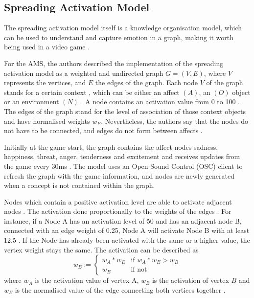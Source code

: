 \subsection{Spreading Activation Model}

The spreading activation model \cite{collins1975spreading} itself is a knowledge 
organisation model, which can be used to understand and capture emotion \cite{hutMcCormAms}\cite{carr1982words} in a graph, making it 
worth being used in a video game \cite{hutMcCormAms}.

For the AMS, the authors described the implementation
of the spreading activation model as a weighted and 
undirected graph \( G = (V, E) \)\cite{hutMcCormAms}, where 
\( V \) represents the vertices, and \( E \) the edges of the
graph. Each node \( V \) of the graph 
stands for a certain context \cite{hutMcCormAms}, which can
be either an affect \( (A) \), an  \( (O) \) object or an environment \( (N) \) \cite{hutMcCormAms}. A node
contains an activation value from 0 to 100 \cite{hutMcCormAms}. The 
edges of the graph stand for the level of  association 
of those context objects \cite{hutMcCormAms} 
and have normalised weights \( w_E\). Nevertheless, the authors
say that the nodes do not have to be connected, and edges do not 
form between affects \cite{hutMcCormAms}. 

Initially at the game
start, the graph contains the affect nodes sadness, happiness, 
threat, anger, tenderness and excitement \cite{hutMcCormAms}
and receives updates from the game every 30ms \cite{hutMcCormAms}.
The model uses an Open Sound Control (OSC) client to refresh
the graph with the game information, and nodes are newly generated
when a concept is not contained within the graph.

Nodes which contain a positive activation level are able to activate
adjacent nodes \cite{hutMcCormAms}. The activation done proportionally to the weights
of the edges \cite{hutMcCormAms}. For instance, if a Node A has an activation level
of 50 and has an adjacent node B, connected with an edge weight
of 0.25, Node A will activate Node B with at least 12.5 \cite{hutMcCormAms}. If
the Node has already been activated with the same or a higher
value, the vertex weight stays the same. The activation
can be described as \[
w_B := 
\begin{cases} 
w_A * w_E & \text{if } w_A * w_E > w_B \\
w_B & \text{if not} 
\end{cases}
\] 
where \( w_A \) is the activation value of vertex A, \( w_B \)
is the activation of vertex \(B\) and \( w_E \) is the normalised value
of the edge connecting both vertices together \cite{hutMcCormAms}.


